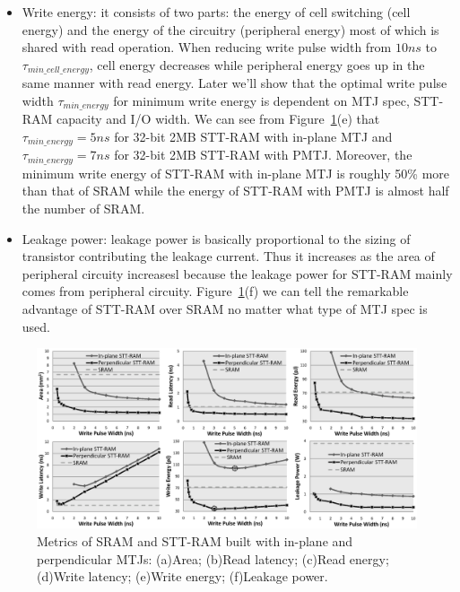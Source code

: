 \begin{itemize}
\item Write energy: it consists of two parts: the energy of cell switching (cell energy) and the energy of the circuitry (peripheral energy) most of which is shared with read operation. When reducing write pulse width from $10ns$ to $\tau_{min\_cell\_energy}$, cell energy decreases while peripheral energy goes up in the same manner with read energy. Later we'll show that the optimal write pulse width $\tau_{min\_energy}$ for minimum write energy is dependent on MTJ spec, STT-RAM capacity and I/O width. We can see from Figure~\ref{fig:metrics}(e) that $\tau_{min\_energy} = 5ns$ for 32-bit 2MB STT-RAM with in-plane MTJ and $\tau_{min\_energy}= 7ns$ for 32-bit 2MB STT-RAM with PMTJ. Moreover, the minimum write energy of STT-RAM with in-plane MTJ is roughly 50\% more than that of SRAM while the energy of STT-RAM with PMTJ is almost half the number of SRAM.
\item Leakage power: leakage power is basically proportional to the sizing of transistor contributing the leakage current. Thus it increases as the area of peripheral circuity increasesl because the leakage power for STT-RAM mainly comes from peripheral circuity. Figure~\ref{fig:metrics}(f) we can tell the remarkable advantage of STT-RAM over SRAM no matter what type of MTJ spec is used.
\end{itemize}


\begin{figure}[t]
  \centering
  \includegraphics[width=7in]{fig/AllMetrics.eps}
  \caption{Metrics of SRAM and STT-RAM built with in-plane and perpendicular MTJs: (a)Area; (b)Read latency; (c)Read energy; (d)Write latency; (e)Write energy; (f)Leakage power.}
  \label{fig:metrics}
\end{figure}

